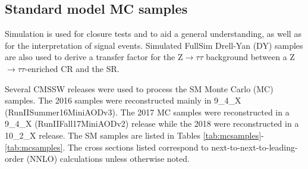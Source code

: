 \subsection{Standard model MC samples}
\label{sec:sm-mc}

Simulation is used for closure tests and to aid a general understanding, as well as for the interpretation of signal events. Simulated FullSim Drell-Yan (DY) samples are also used to derive a transfer factor for the Z$\rightarrow\tau\tau$ background between a Z$\rightarrow\tau\tau$-enriched CR and the SR.

Several CMSSW releases were used to process the SM Monte Carlo (MC) samples.
The 2016 samples were reconstructed mainly in 9\_4\_X (RunIISummer16MiniAODv3). The 2017 MC samples were reconstructed in a 9\_4\_X (RunIIFall17MiniAODv2) release while the 2018 were reconstructed in a 10\_2\_X release.
The SM samples are listed in Tables \ref{tab:mcsamples}-\ref{tab:mcsamples}.  The cross
sections listed correspond to next-to-next-to-leading-order (NNLO) calculations
unless otherwise noted. 



